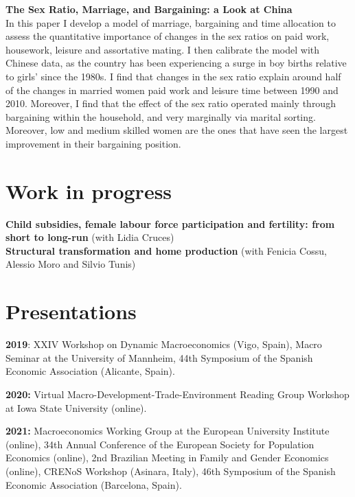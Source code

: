 \documentclass[margin]{res} %
\begin{document}
\begin{resume}
{\bf The Sex Ratio, Marriage, and Bargaining: a Look at China} \\
In this paper I develop a model of marriage, bargaining and time allocation to assess the quantitative importance of changes in the sex ratios on paid work, housework, leisure and assortative mating. I then calibrate the model with Chinese data, as the country has been experiencing a surge in boy births relative to girls' since the 1980s. I find that changes in the sex ratio explain around half of the changes in married women paid work and leisure time between 1990 and 2010. Moreover, I find that the effect of the sex ratio operated mainly through bargaining within the household, and very marginally via marital sorting. Moreover, low and medium skilled women are the ones that have seen the largest improvement in their bargaining position.

\section{Work in progress}

{\bf Child subsidies, female labour force participation
and fertility: from short to long-run} (with Lidia Cruces)
\\
{\bf Structural transformation and home production} (with Fenicia Cossu, Alessio Moro and Silvio Tunis)

\section{Presentations}

{\bf 2019}: XXIV Workshop on Dynamic Macroeconomics (Vigo, Spain), Macro Seminar at the University of Mannheim, 44th Symposium of the Spanish Economic Association (Alicante, Spain).

{\bf 2020:} Virtual Macro-Development-Trade-Environment Reading Group Workshop at Iowa State University (online).

{\bf 2021:} Macroeconomics Working Group at the European University Institute (online), 34th Annual Conference of the European Society for Population Economics (online), 2nd Brazilian Meeting in Family and Gender Economics (online), CRENoS Workshop (Asinara, Italy), 46th Symposium of the Spanish Economic Association (Barcelona, Spain).




\end{resume}
\end{document}
